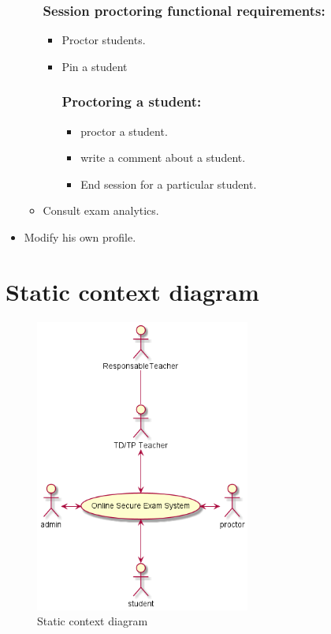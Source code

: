 \documentclass[a4paper,12p]{article}
\begin{document}
\begin{itemize}
\begin{itemize}
            \subsubsection{Session proctoring functional requirements:}
            \begin{itemize}
                \item Proctor students.
                \item Pin a student
                \subsubsection{Proctoring a student:}
                \begin{itemize}
                    \item proctor a student.
                    \item write a comment about a student.
                    \item End session for a particular student.
             \end{itemize}
         \end{itemize}
        \item Consult exam analytics.
     \end{itemize}
     \item Modify his own profile.
    \end{itemize}

    \clearpage

     \section{Static context diagram}
     \vspace{5cm}
     \begin{figure}[h]

         \centering
         \includegraphics[width=200pt]{SCD}
         \caption{Static context diagram}
     \end{figure}
\end{document}
